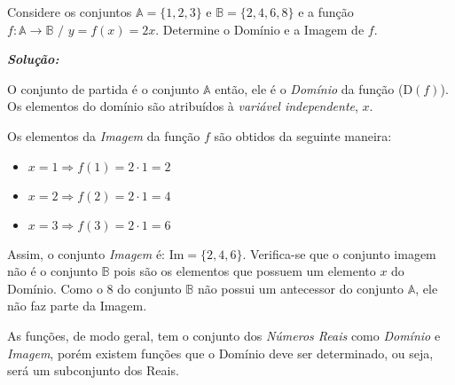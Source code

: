 \begin{example}
	Considere os conjuntos $\mathbb{A}=\{1,2,3\}$ e $\mathbb{B}=\{2,4,6,8\}$ e a função $f: \mathbb{A} \rightarrow \mathbb{B} \,\, / \,\, y=f(x)=2x$. Determine o Domínio e a Imagem de $f$.

\vspace{.5cm}
\textit{\textbf{Solução:}}

\vspace{.5cm}
O conjunto de partida é o conjunto $\mathbb{A}$ então, ele é o \textit{Domínio} da função ($\mathrm{D}(f)$). Os elementos do domínio são atribuídos à \textit{variável independente}, $x$.

Os elementos da \textit{Imagem} da função $f$ são obtidos da seguinte maneira:
\vspace{.5cm}
\begin{itemize}
	\item{$x=1 \Rightarrow f(1)=2\cdot 1 = 2$}
	\item{$x=2 \Rightarrow f(2)=2\cdot 1 = 4$}
	\item{$x=3 \Rightarrow f(3)=2\cdot 1 = 6$}
\end{itemize}

\vspace{.5cm}
Assim, o conjunto \textit{Imagem} é: $\mathrm{Im}=\{2,4,6\}$. Verifica-se que o conjunto imagem não é o conjunto $\mathbb{B}$ pois são os elementos que possuem um elemento $x$ do Domínio. Como o $8$ do conjunto $\mathbb{B}$ não possui um antecessor do conjunto $\mathbb{A}$, ele não faz parte da Imagem.
\end{example}

As funções, de modo geral, tem o conjunto dos \textit{Números Reais} como \textit{Domínio} e \textit{Imagem}, porém existem funções que o Domínio deve ser determinado, ou seja, será um subconjunto dos Reais.

